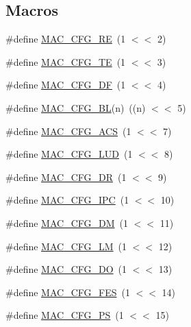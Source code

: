 \subsection*{Macros}
\begin{DoxyCompactItemize}
\item 
\#define \hyperlink{group___e_n_e_t__18_x_x__43_x_x_ga2721f8d972eb40257f01e4fc759cb77b}{M\+A\+C\+\_\+\+C\+F\+G\+\_\+\+RE}~(1 $<$$<$ 2)
\item 
\#define \hyperlink{group___e_n_e_t__18_x_x__43_x_x_gadc2c8777c829511a3ca33ad2fe43422e}{M\+A\+C\+\_\+\+C\+F\+G\+\_\+\+TE}~(1 $<$$<$ 3)
\item 
\#define \hyperlink{group___e_n_e_t__18_x_x__43_x_x_ga76e80594820118f47b7084cbcf46e82d}{M\+A\+C\+\_\+\+C\+F\+G\+\_\+\+DF}~(1 $<$$<$ 4)
\item 
\#define \hyperlink{group___e_n_e_t__18_x_x__43_x_x_ga2a697be40e04ceabe0117c0e4e3451bc}{M\+A\+C\+\_\+\+C\+F\+G\+\_\+\+BL}(n)~((n) $<$$<$ 5)
\item 
\#define \hyperlink{group___e_n_e_t__18_x_x__43_x_x_ga140334e75dfd4bc924c373c59c885347}{M\+A\+C\+\_\+\+C\+F\+G\+\_\+\+A\+CS}~(1 $<$$<$ 7)
\item 
\#define \hyperlink{group___e_n_e_t__18_x_x__43_x_x_ga37c114c1f880a796a67ded01e54a0ac3}{M\+A\+C\+\_\+\+C\+F\+G\+\_\+\+L\+UD}~(1 $<$$<$ 8)
\item 
\#define \hyperlink{group___e_n_e_t__18_x_x__43_x_x_gaacc3f1e13f32b5cd272388cc3881d47c}{M\+A\+C\+\_\+\+C\+F\+G\+\_\+\+DR}~(1 $<$$<$ 9)
\item 
\#define \hyperlink{group___e_n_e_t__18_x_x__43_x_x_ga7976527b6a27cf4914acd260a2da2fed}{M\+A\+C\+\_\+\+C\+F\+G\+\_\+\+I\+PC}~(1 $<$$<$ 10)
\item 
\#define \hyperlink{group___e_n_e_t__18_x_x__43_x_x_ga88f18b0bf9c694534e3616971de33f74}{M\+A\+C\+\_\+\+C\+F\+G\+\_\+\+DM}~(1 $<$$<$ 11)
\item 
\#define \hyperlink{group___e_n_e_t__18_x_x__43_x_x_gabfd535c7e4f58dcde4ce3f7d1de3c1a7}{M\+A\+C\+\_\+\+C\+F\+G\+\_\+\+LM}~(1 $<$$<$ 12)
\item 
\#define \hyperlink{group___e_n_e_t__18_x_x__43_x_x_gaee61760c1d9f16418075db2cc35183ce}{M\+A\+C\+\_\+\+C\+F\+G\+\_\+\+DO}~(1 $<$$<$ 13)
\item 
\#define \hyperlink{group___e_n_e_t__18_x_x__43_x_x_ga7557ac2cad88370770bcbf926a91548d}{M\+A\+C\+\_\+\+C\+F\+G\+\_\+\+F\+ES}~(1 $<$$<$ 14)
\item 
\#define \hyperlink{group___e_n_e_t__18_x_x__43_x_x_gae6c433017373eee4981c1768af1b0555}{M\+A\+C\+\_\+\+C\+F\+G\+\_\+\+PS}~(1 $<$$<$ 15)
$$
\end{DoxyCompactItemize}
